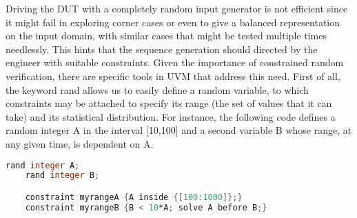 Driving the DUT with a completely random input generator is not efficient since it might fail in exploring corner cases or even to give a balanced representation on the input domain, with similar cases that might be tested multiple times needlessly. This hints that the sequence generation should directed by the engineer with suitable constraints. Given the importance of constrained random verification, there are specific tools in UVM that address this need. First of all, the keyword rand allows us to easily define a random variable, to which constraints may be attached to specify its range (the set of values that it can take) and its statistical distribution. For instance, the following code defines a random integer A in the interval [10,100] and a second variable B whose range, at any given time, is dependent on A.
\begin{lstlisting}[language=verilog, caption= Constrained random sequencer from \textit{packet\_in.sv}]
	rand integer A;
	rand integer B;

	constraint myrangeA {A inside {[100:1000]};}
	constraint myrangeB {B < 10*A; solve A before B;}
\end{lstlisting}
